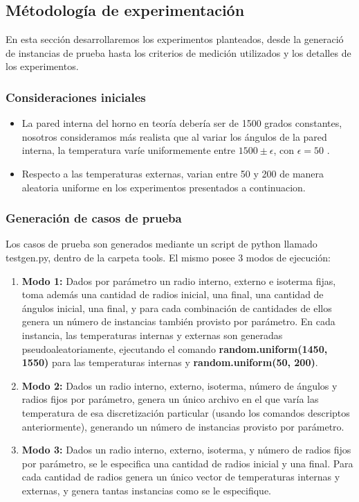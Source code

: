 \subsection{Métodología de experimentación}
En esta sección desarrollaremos los experimentos planteados, desde la generació de instancias de prueba hasta los criterios de medición utilizados y los detalles de los experimentos.
\subsubsection{Consideraciones iniciales}
\begin{itemize}
    \item La pared interna del horno en teoría debería ser de 1500 grados constantes, nosotros consideramos más realista que al variar los ángulos de la pared interna, la temperatura varíe uniformemente entre $1500 \pm \epsilon$, con $\epsilon = 50$ .

    \item Respecto a las temperaturas externas, varian entre 50 y 200 de manera aleatoria uniforme en los experimentos presentados a continuacion.
\end{itemize}

\subsubsection{Generación de casos de prueba}
Los casos de prueba son generados mediante un script de python llamado testgen.py, dentro de la carpeta tools. El mismo posee 3 modos de ejecuci\'on: 
\begin{enumerate}
    \item \textbf{Modo 1:} Dados por par\'ametro un radio interno, externo e isoterma fijas, toma adem\'as  una cantidad de radios inicial, una final, una cantidad de \'angulos inicial, una final, y para cada combinaci\'on de cantidades de ellos genera un n\'umero de instancias tambi\'en provisto por par\'ametro. En cada instancia, las temperaturas internas y externas son generadas pseudoaleatoriamente, ejecutando el comando \textbf{random.uniform(1450, 1550)} para las temperaturas internas y \textbf{random.uniform(50, 200)}.
    \item \textbf{Modo 2:} Dados un radio interno, externo, isoterma, n\'umero de \'angulos y radios fijos por par\'ametro, genera un \'unico archivo en el que var\'ia las temperatura de esa discretizaci\'on particular (usando los comandos descriptos anteriormente), generando un n\'umero de instancias provisto por par\'ametro.
    \item \textbf{Modo 3:} Dados un radio interno, externo, isoterma, y n\'umero de radios fijos por par\'ametro, se le especifica una cantidad de radios inicial y una final.  Para cada cantidad de radios genera un \'unico vector de temperaturas internas y externas, y genera tantas instancias como se le especifique.

\end{enumerate}

